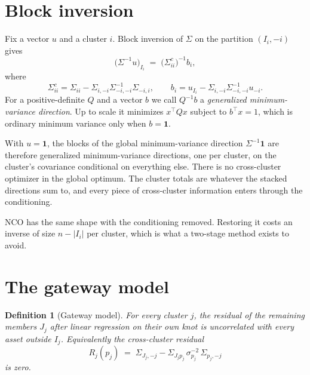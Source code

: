\documentclass[11pt]{article}
\newcommand{\ones}{\mathbf{1}}
\newtheorem{definition}{Definition}
\begin{document}
\section{Block inversion}

Fix a vector $u$ and a cluster $i$. Block inversion of $\Sigma$ on the
partition $(I_i,-i)$ gives \cite[App.~A]{cotton2024schur}
\begin{equation}
  \big(\Sigma^{-1}u\big)_{I_i}
  \;=\; \big(\Sigma^{c}_{ii}\big)^{-1} b_i,
  \label{eq:blockinv}
\end{equation}
where
\begin{equation}
  \Sigma^{c}_{ii} = \Sigma_{ii}-\Sigma_{i,-i}\Sigma_{-i,-i}^{-1}\Sigma_{-i,i},
  \qquad
  b_i = u_{I_i}-\Sigma_{i,-i}\Sigma_{-i,-i}^{-1}u_{-i} .
  \label{eq:complement}
\end{equation}
For a positive-definite $Q$ and a vector $b$ we call $Q^{-1}b$ a
\emph{generalized minimum-variance direction}. Up to scale it minimizes
$x^\top Qx$ subject to $b^\top x=1$, which is ordinary minimum variance only
when $b=\ones$.

With $u=\ones$, the blocks of the global minimum-variance direction
$\Sigma^{-1}\ones$ are therefore generalized minimum-variance directions,
one per cluster, on the cluster's covariance conditional on everything
else. There is no cross-cluster optimizer in the global optimum. The
cluster totals are whatever the stacked directions sum to, and every piece
of cross-cluster information enters through the conditioning.

NCO has the same shape with the conditioning removed. Restoring it costs an
inverse of size $n-|I_i|$ per cluster, which is what a two-stage method
exists to avoid.

\section{The gateway model}
\label{sec:gateway}

\begin{definition}[Gateway model]
For every cluster $j$, the residual of the remaining members $J_j$ after linear
regression on their own knot is uncorrelated with every asset outside
$I_j$. Equivalently the cross-cluster residual
\begin{equation}
  R_j(p_j) \;=\; \Sigma_{J_j,-j}-\Sigma_{J_j p_j}\,\sigma_{p_j}^{-2}\,\Sigma_{p_j,-j}
  \label{eq:residual}
\end{equation}
is zero.
\end{definition}
\end{document}
